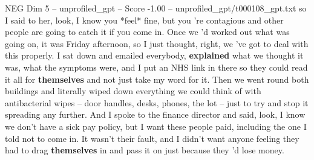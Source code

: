 \begin{textsample}{NEG Dim 5 – unprofiled\_gpt – Score -1.00 – unprofiled\_gpt/t000108\_gpt.txt}  \label{ex:f5_neg_017}
so I said to her, look, I know you *feel* fine, but you ’re contagious and other people are going to catch it if you come in.
Once we ’d worked out what was going on, it was Friday afternoon, so I just thought, right, we ’ve got to deal with this properly.
I sat down and emailed everybody, \textbf{explained} what we thought it was, what the symptoms were, and I put an NHS link in there so they could read it all for \textbf{themselves} and not just take my word for it.
Then we went round both buildings and literally wiped down everything we could think of with antibacterial wipes – door handles, desks, phones, the lot – just to try and stop it spreading any further.
And I spoke to the finance director and said, look, I know we don't have a sick pay policy, but I want these people paid, including the one I told not to come in.
It wasn't their fault, and I didn't want anyone feeling they had to drag \textbf{themselves} in and pass it on just because they ’d lose money.

\end{textsample}
